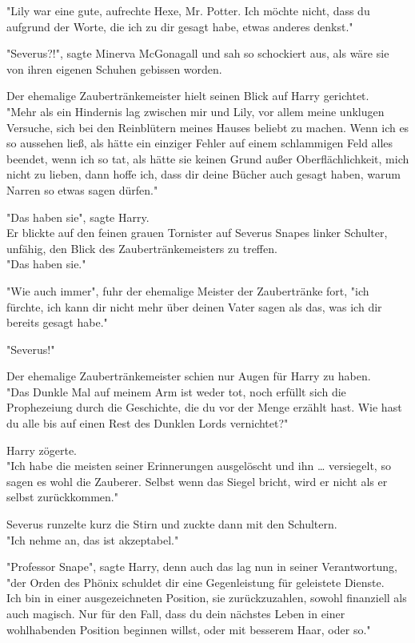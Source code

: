 {"Lily war eine gute, aufrechte Hexe, Mr. Potter. Ich möchte nicht, dass du aufgrund der Worte, die ich zu dir gesagt habe, etwas anderes denkst."

"Severus?!", sagte Minerva McGonagall und sah so schockiert aus, als wäre sie von ihren eigenen Schuhen gebissen worden.

Der ehemalige Zaubertränkemeister hielt seinen Blick auf Harry gerichtet.\\ "Mehr als ein Hindernis lag zwischen mir und Lily, vor allem meine unklugen Versuche, sich bei den Reinblütern meines Hauses beliebt zu machen. Wenn ich es so aussehen ließ, als hätte ein einziger Fehler auf einem schlammigen Feld alles beendet, wenn ich so tat, als hätte sie keinen Grund außer Oberflächlichkeit, mich nicht zu lieben, dann hoffe ich, dass dir deine Bücher auch gesagt haben, warum Narren so etwas sagen dürfen."

"Das haben sie", sagte Harry.\\ Er blickte auf den feinen grauen Tornister auf Severus Snapes linker Schulter, unfähig, den Blick des Zaubertränkemeisters zu treffen.\\ "Das haben sie."

"Wie auch immer", fuhr der ehemalige Meister der Zaubertränke fort, "ich fürchte, ich kann dir nicht mehr über deinen Vater sagen als das, was ich dir bereits gesagt habe."

"Severus!"

Der ehemalige Zaubertränkemeister schien nur Augen für Harry zu haben.\\ "Das Dunkle Mal auf meinem Arm ist weder tot, noch erfüllt sich die Prophezeiung durch die Geschichte, die du vor der Menge erzählt hast. Wie hast du alle bis auf einen Rest des Dunklen Lords vernichtet?"

Harry zögerte.\\ "Ich habe die meisten seiner Erinnerungen ausgelöscht und ihn … versiegelt, so sagen es wohl die Zauberer. Selbst wenn das Siegel bricht, wird er nicht als er selbst zurückkommen."

Severus runzelte kurz die Stirn und zuckte dann mit den Schultern.\\ "Ich nehme an, das ist akzeptabel."

"Professor Snape", sagte Harry, denn auch das lag nun in seiner Verantwortung, "der Orden des Phönix schuldet dir eine Gegenleistung für geleistete Dienste.\\ Ich bin in einer ausgezeichneten Position, sie zurückzuzahlen, sowohl finanziell als auch magisch. Nur für den Fall, dass du dein nächstes Leben in einer wohlhabenden Position beginnen willst, oder mit besserem Haar, oder so."

}
